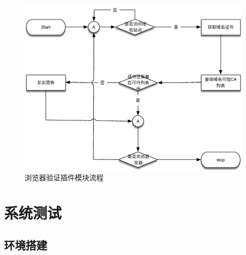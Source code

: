\begin{figure}[htbp]
 	\centering
 	\includegraphics[width=1\textwidth]{img/chrome_extension}
 	\caption{浏览器验证插件模块流程}\label{fig:chrome_extension}
\end{figure}





	





\section{系统测试}


\subsection{环境搭建}



